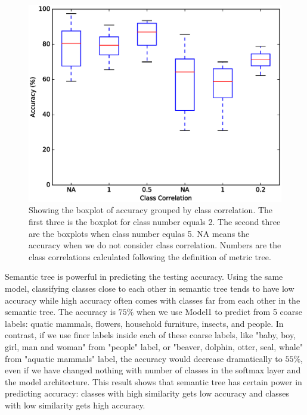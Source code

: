 \documentclass[conference]{IEEEtran}
\begin{document}
\begin{spacing}{0.9}
\begin{figure}
\centering
  \includegraphics[scale=0.4]{metricTreeEffect.ps}
\caption{Showing the boxplot of accuracy grouped by class correlation. The first three is the boxplot for class number equals 2. The second three are the boxplots when class number equlas 5. NA means the accuracy when we do not consider class correlation. Numbers are the class correlations calculated following the definition of metric tree. }
\label{fig:semanticTreeEffect}
\end{figure}

Semantic tree is powerful in predicting the testing accuracy. Using the same model, classifying classes close to each other in semantic tree tends to have low accuracy while high accuracy often comes with classes far from each other in the semantic tree. The accuracy is $75\%$ when we use Model1 to predict from 5 coarse labels: quatic mammals, flowers, household furniture, insects, and people. In contrast, if we use finer labels inside each of these coarse labels, like "baby, boy, girl, man and woman" from "people" label, or "beaver, dolphin, otter, seal, whale" from "aquatic mammals" label, the accuracy would decrease dramatically to $55\%$, even if we have changed nothing with number of classes in the softmax layer and the model architecture. This result shows that semantic tree has certain power in predicting accuracy: classes with high similarity gets low accuracy and classes with low similarity gets high accuracy.


\end{spacing}
\end{document}
